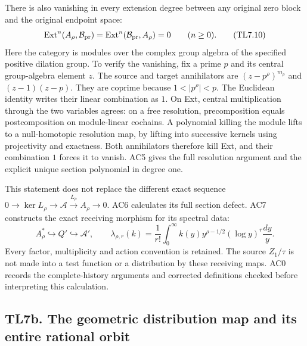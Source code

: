 There is also vanishing in every extension degree between any original
zero block and the original endpoint space: \[
\operatorname{Ext}^{n}(A_\rho,\mathcal B_{\rm pr})=
\operatorname{Ext}^{n}(\mathcal B_{\rm pr},A_\rho)=0
\qquad(n\ge0).
\tag{TL7.10}
\] Here the category is modules over the complex group algebra of the
specified positive dilation group. To verify the vanishing, fix a prime
\(p\) and its central group-algebra element \(z\). The source and target
annihilators are \((z-p^\rho)^{m_\rho}\) and \((z-1)(z-p)\). They are
coprime because \(1<|p^\rho|<p\). The Euclidean identity writes their
linear combination as \(1\). On Ext, central multiplication through the
two variables agrees: on a free resolution, precomposition equals
postcomposition on module-linear cochains. A polynomial killing the
module lifts to a null-homotopic resolution map, by lifting into
successive kernels using projectivity and exactness. Both annihilators
therefore kill Ext, and their combination \(1\) forces it to vanish. AC5
gives the full resolution argument and the explicit unique section
polynomial in degree one.

This statement does not replace the different exact sequence
\(0\to\ker L_\rho\to\mathcal A\xrightarrow{L_\rho}A_\rho\to0\). AC6
calculates its full section defect. AC7 constructs the exact receiving
morphism for its spectral data: \[
A_\rho^*\hookrightarrow Q'\hookrightarrow\mathcal A',\qquad
\lambda_{\rho,r}(k)=\frac1{r!}\int_0^\infty
k(y)y^{\rho-1/2}(\log y)^r\frac{dy}{y}.
\tag{TL7.11}
\] Every factor, multiplicity and action convention is retained. The
source \(Z_1/\tau\) is not made into a test function or a distribution
by these receiving maps. AC0 records the complete-history arguments and
corrected definitions checked before interpreting this calculation.

\subsection{TL7b. The geometric distribution map and its entire rational
orbit}\label{tl7b.-the-geometric-distribution-map-and-its-entire-rational-orbit}

